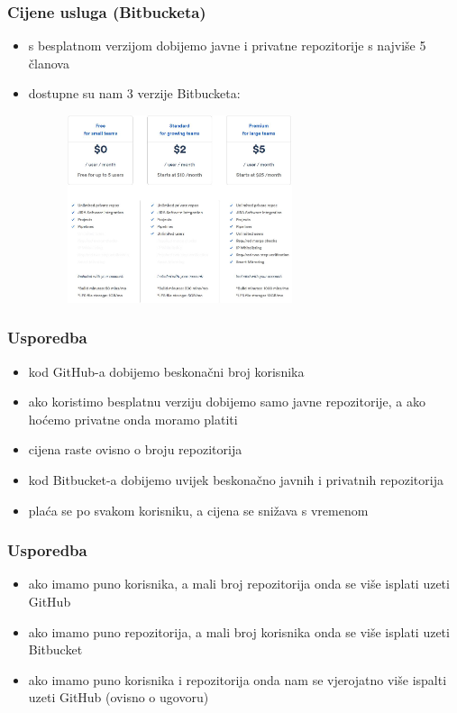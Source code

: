 \documentclass[12p, Times New Roman]{beamer}
\begin{document}
	\begin{frame} 				%
		\frametitle{Cijene usluga (Bitbucketa)}

		\begin{itemize}
			\item s besplatnom verzijom dobijemo javne i privatne repozitorije s najviše 5 članova
			\item dostupne su nam 3 verzije Bitbucketa: 
			

		\end{itemize}

		\begin{figure}
			\begin{center}
				\includegraphics[width=8cm, height=5.5cm]{priceb.png}
			\end{center}
		\end{figure}
	\end{frame}




	\begin{frame}				%
		\frametitle{Usporedba}
		\begin{itemize}
			\item kod GitHub-a dobijemo beskonačni broj korisnika 
			\item ako koristimo besplatnu verziju dobijemo samo javne repozitorije, a ako hoćemo privatne onda moramo platiti
			\item cijena raste ovisno o broju repozitorija
			\item kod Bitbucket-a dobijemo uvijek beskonačno javnih i privatnih repozitorija
			\item plaća se po svakom korisniku, a cijena se snižava s vremenom

		\end{itemize}

	\end{frame}



	\begin{frame}				%
		\frametitle{Usporedba}

		\begin{itemize}
			\item ako imamo puno korisnika, a mali broj repozitorija onda se više isplati uzeti GitHub
			\item ako imamo puno repozitorija, a mali broj korisnika onda se više isplati uzeti Bitbucket
			\item ako imamo puno korisnika i repozitorija onda nam se vjerojatno više ispalti uzeti GitHub (ovisno o ugovoru)

		\end{itemize}


	\end{frame}
\end{document}
